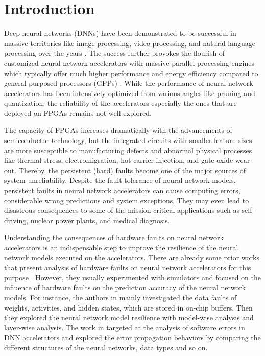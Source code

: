 \section{Introduction} \label{sec:introduction}
Deep neural networks (DNNs) have been demonstrated to be successful in 
massive territories like image processing, video processing, and 
natural language processing over the years \cite{Gatys_2016_CVPR, Collobert:2008:UAN:1390156.1390177, 
Chen_2015_ICCV}. The success further provokes the 
flourish of customized neural network accelerators 
with massive parallel processing engines which typically offer
much higher performance and energy efficiency compared to 
general purposed processors (GPPs) 
\cite{chen2014diannao, chen2014dadiannao,  chen2016eyeriss, Zhang:2015:OFA:2684746.2689060, 7551397}.
While the performance of neural network accelerators has been intensively 
optimized from various angles like pruning and quantization, 
the reliability of the accelerators especially 
the ones that are deployed on FPGAs remains not well-explored.

The capacity of FPGAs increases dramatically with the 
advancements of semiconductor technology, but the integrated 
circuits with smaller feature sizes are more susceptible to 
manufacturing defects and abnormal physical processes like 
thermal stress, electromigration, hot carrier injection, 
and gate oxide wear-out. Thereby, the 
persistent (hard) faults become one of the major sources 
of system unreliability. Despite the fault-tolerance of 
neural network models, persistent faults in neural network 
accelerators can cause computing errors, considerable 
wrong predictions \cite{238315} and system exceptions. 
They may even lead to disastrous 
consequences to some of the mission-critical applications such as 
self-driving, nuclear power plants, and medical diagnosis. 

Understanding the consequences of hardware faults on neural network accelerators 
is an indispensable step to improve the resilience of the neural 
network models executed on the accelerators. There are already some 
prior works that present analysis of hardware faults on neural network 
accelerators for this purpose \cite{Reagen2018, Kausar2016Artificial, Li2018TensorFI, 
Li2017, Salami2018}. However, they usually experimented with 
simulators and focused on the influence of hardware faults on the 
prediction accuracy of the neural network models. 
For instance, the authors in \cite{Reagen2018} 
mainly investigated the data faults of weights, activities, 
and hidden states, which are stored in on-chip buffers.
Then they explored the neural network model resilience with 
model-wise analysis and layer-wise analysis. The work 
in \cite{Li2017} targeted at the analysis of software errors 
in DNN accelerators and explored the error propagation 
behaviors by comparing the different structures of the neural networks, 
data types and so on. 

